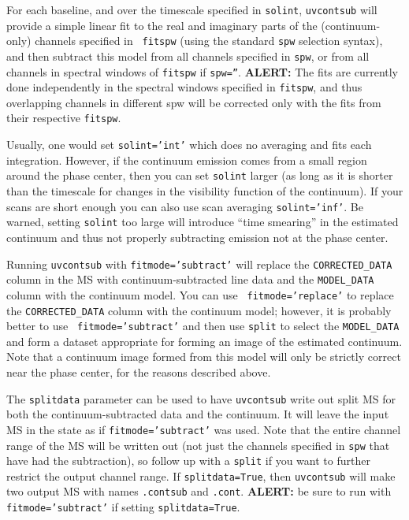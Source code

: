For each baseline, and over the timescale specified in {\tt solint},
{\tt uvcontsub} will provide a simple linear fit to the real and
imaginary parts of the (continuum-only) channels specified in {\tt
fitspw} (using the standard {\tt spw} selection syntax), 
and then subtract this model from all channels specified in {\tt spw}, or
from all channels in spectral windows of {\tt fitspw} if {\tt spw=''}.
{\bf ALERT:} The fits are currently done independently in the
spectral windows specified in {\tt fitspw}, and thus overlapping
channels in different spw will be corrected only with the fits from
their respective {\tt fitspw}.

Usually, one would set {\tt solint='int'} which does no
averaging and fits each integration.  However, if the continuum
emission comes from a small region around the phase center, then
you can set {\tt solint} larger (as long as it is 
shorter than the timescale for changes in the
visibility function of the continuum).
If your scans are short enough you can also use scan averaging 
{\tt solint='inf'}.  Be warned, setting {\tt solint} too large will
introduce ``time smearing'' in the estimated continuum and thus not
properly subtracting emission not at the phase center.  

Running {\tt uvcontsub} with {\tt fitmode='subtract'} will replace the
{\tt CORRECTED\_DATA} column in the MS with continuum-subtracted line data
and the {\tt MODEL\_DATA} column with the continuum model.  You can use {\tt
fitmode='replace'} to replace the {\tt CORRECTED\_DATA} column with the
continuum model; however, it is probably better to use {\tt
fitmode='subtract'} and then use {\tt split} to select the {\tt MODEL\_DATA}
and form a dataset appropriate for forming an image of the estimated
continuum.  Note that a continuum image formed from this model will
only be strictly correct near the phase center, for the reasons
described above.

The {\tt splitdata} parameter can be used to have {\tt uvcontsub}
write out split MS for both the continuum-subtracted data and the
continuum.  It will leave the input MS in the state as if 
{\tt fitmode='subtract'} was used.  Note that the entire channel
range of the MS will be written out (not just the channels specified
in {\tt spw} that have had the subtraction), so follow up with
a {\tt split} if you want to further restrict the output channel range.
If {\tt splitdata=True}, then {\tt uvcontsub} will make two output
MS with names {\tt <input msname>.contsub} and {\tt <input msname>.cont}.
{\bf ALERT:} be sure to
run with {\tt fitmode='subtract'} if setting {\tt splitdata=True}.

